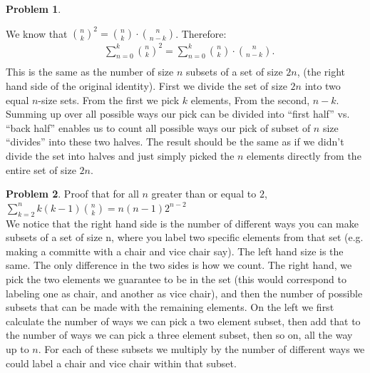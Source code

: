 \documentclass{article}
\theoremstyle{definition}
\newtheorem{problem}{Problem}
\begin{document}
\begin{problem}
    \ \\

\end{problem}
We know that ${n\choose k}^2 = {n\choose k} \cdot {n\choose{n-k}}$. Therefore:
\begin{align*}
    &\sum_{n=0}^k {n\choose k}^2 = \sum_{n=0}^k {n\choose k} \cdot {n \choose {n-k}}.\\ 
\end{align*}
This is the same as the number of size $n$ subsets of a set of size $2n$, (the right hand side of the original identity). First
we divide the set of size $2n$ into two equal $n$-size sets. From the first
we pick $k$ elements, From the second, $n-k$. Summing up over all possible ways our pick
can be divided into ``first half'' vs. ``back half'' enables us to count all possible ways our pick of subset of $n$ size 
``divides'' into these two halves. The result should be the same as if we didn't divide the set into halves and just simply picked
the $n$ elements directly from the entire set of size $2n$.
\begin{problem}
Proof that for all $n$ greater than or equal to $2$, $\sum_{k=2}^n k(k-1) {n \choose k} = n(n-1)2^{n-2}$\\

We notice that the right hand side is the number of different ways you can make subsets of a set of size n, where you label two specific elements from that set (e.g. making a committe with a chair and vice chair say). The left hand size is 
the same. The only difference in the two sides is how we count. The right hand, we pick the two elements we guarantee to be in the set (this would correspond to labeling one as chair, and another as vice chair),
and then the number of possible subsets that can be made with the remaining elements. On the left we first calculate the number of ways we can pick a two element subset,
then add that to the number of ways we can pick a three element subset, then so on, all the way up to $n$. For each of these subsets we multiply by the number of different ways we could label a chair and vice chair within that subset.\\
\end{problem}
\end{document}
